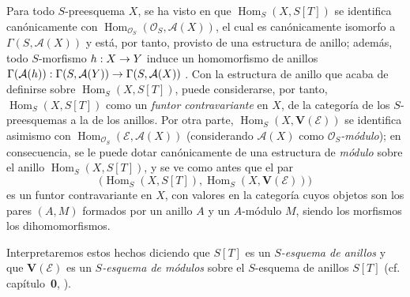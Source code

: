 \documentclass[oneside,10pt]{amsart}
\makeatletter
\newcommand{\ega@arrow}[2]{\mathchoice{#1}{#2}{#2}{#2}}
\renewcommand{\to}{\ega@arrow{\longrightarrow}{\rightarrow}}
\let\EGAOriginalLabel\label
\renewcommand{\label}[1]{\phantomsection\EGAOriginalLabel{#1}}
\makeatother
\begin{document}
\begin{env}[1.7.13]
\label{II.1.7.13-fr}
Para todo $S$-preesquema $X$, se ha visto en  que $\operatorname{Hom}_S(X,S[T])$ se identifica canónicamente con $\operatorname{Hom}_{\mathcal{O}_S}(\mathcal{O}_S,\mathcal{A}(X))$, el cual es canónicamente isomorfo a $\Gamma(S,\mathcal{A}(X))$ y está, por tanto, provisto de una estructura de anillo; además, todo $S$-morfismo $h:X\to Y$ induce un homomorfismo de anillos
$\Gamma(\mathcal{A}(h)):\Gamma(S,\mathcal{A}(Y))
\to\Gamma(S,\mathcal{A}(X))$
.
Con la estructura de anillo que acaba de definirse sobre $\operatorname{Hom}_S(X,S[T])$, puede considerarse, por tanto, $\operatorname{Hom}_S(X,S[T])$ como un \emph{funtor contravariante} en $X$, de la categoría de los $S$-preesquemas a la de los anillos.
Por otra parte, $\operatorname{Hom}_S(X,\mathbf{V}(\mathcal{E}))$ se identifica asimismo con $\operatorname{Hom}_{\mathcal{O}_S}(\mathcal{E},\mathcal{A}(X))$ (considerando $\mathcal{A}(X)$ como \emph{$\mathcal{O}_S$-módulo}); en consecuencia, se le puede dotar canónicamente de una estructura de \emph{módulo} sobre el anillo $\operatorname{Hom}_S(X,S[T])$, y se ve como antes que el par
\[
  \bigl(\operatorname{Hom}_S(X,S[T]),
  \operatorname{Hom}_S(X,\mathbf{V}(\mathcal{E}))\bigr)
\]
es un funtor contravariante en $X$, con valores en la categoría cuyos objetos son los pares $(A,M)$ formados por un anillo $A$ y un $A$-módulo $M$, siendo los morfismos los dihomomorfismos.

Interpretaremos estos hechos diciendo que $S[T]$ es un \emph{$S$-esquema de anillos} y que $\mathbf{V}(\mathcal{E})$ es un \emph{$S$-esquema de módulos} sobre el $S$-esquema de anillos $S[T]$ (cf. capítulo~\textbf 0, ).
\end{env}
\end{document}
